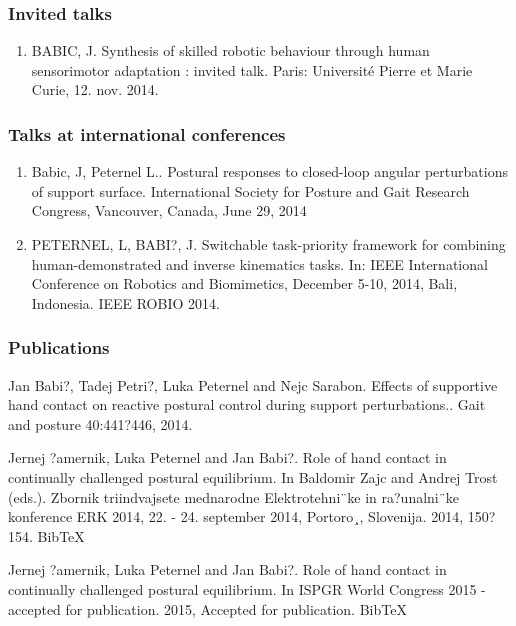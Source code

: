 \subsubsection{Invited talks}

\begin{enumerate}

\item BABIC, J. Synthesis of skilled robotic behaviour through human sensorimotor adaptation : invited talk. Paris: Université Pierre et Marie Curie, 12. nov. 2014.

\end{enumerate}

\subsubsection{Talks at international conferences}

\begin{enumerate}

\item Babic, J, Peternel L.. Postural responses to closed-loop angular perturbations of support surface. International Society for Posture and Gait Research Congress, Vancouver, Canada,  June 29, 2014

\item PETERNEL, L, BABI?, J. Switchable task-priority framework for combining human-demonstrated and inverse kinematics tasks. In: IEEE International Conference on Robotics and Biomimetics, December 5-10, 2014, Bali, Indonesia. IEEE ROBIO 2014.

\end{enumerate}

\subsubsection{Publications}

Jan Babi?, Tadej Petri?, Luka Peternel and Nejc Sarabon. Effects of supportive hand contact on reactive postural control during support perturbations.. Gait and posture 40:441?446, 2014.

Jernej ?amernik, Luka Peternel and Jan Babi?. Role of hand contact in continually challenged postural equilibrium. In Baldomir Zajc and Andrej Trost (eds.). Zbornik triindvajsete mednarodne Elektrotehni¨ke in ra?unalni¨ke konference ERK 2014, 22. - 24. september 2014, Portoro¸, Slovenija. 2014, 150?154. BibTeX

Jernej ?amernik, Luka Peternel and Jan Babi?. Role of hand contact in continually challenged postural equilibrium. In ISPGR World Congress 2015 - accepted for publication. 2015, Accepted for publication. BibTeX

